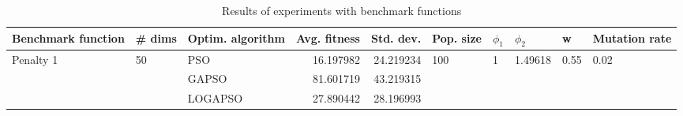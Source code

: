 \begin{table}
\centering
\caption{Results of experiments with benchmark functions}
\begin{tabular}{lllrrlllll}
\toprule
        Benchmark function &             \# dims & Optim. algorithm &  Avg. fitness &  Std. dev. &            Pop. size &         $\phi_{1}$ &               $\phi_{2}$ &                     w &         Mutation rate \\
\midrule
\multirow{3}{*}{Penalty 1} & \multirow{3}{*}{50} &              PSO &     16.197982 &  24.219234 & \multirow{3}{*}{100} & \multirow{3}{*}{1} & \multirow{3}{*}{1.49618} & \multirow{3}{*}{0.55} & \multirow{3}{*}{0.02} \\
                           &                     &            GAPSO &     81.601719 &  43.219315 &                      &                    &                          &                       &                       \\
                           &                     &          LOGAPSO &     27.890442 &  28.196993 &                      &                    &                          &                       &                       \\
\bottomrule
\end{tabular}
\end{table}
